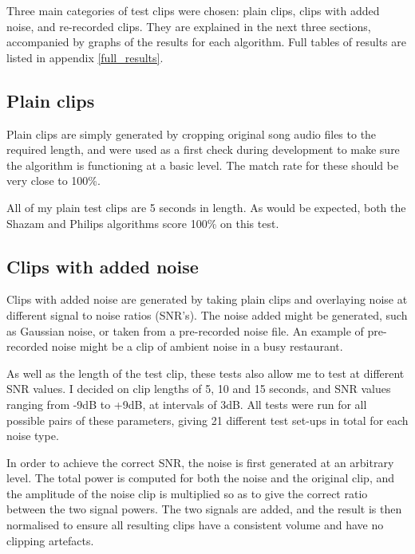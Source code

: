 \documentclass[12pt,a4paper,twoside,openright]{report}
\begin{document}
Three main categories of test clips were chosen: plain clips, clips with added noise, and re-recorded clips. They are explained in the next three sections, accompanied by graphs of the results for each algorithm. Full tables of results are listed in appendix \ref{full_results}.


\subsection{Plain clips}

Plain clips are simply generated by cropping original song audio files to the required length, and were used as a first check during development to make sure the algorithm is functioning at a basic level. The match rate for these should be very close to 100\%.

All of my plain test clips are 5 seconds in length. As would be expected, both the Shazam and Philips algorithms score 100\% on this test.


\subsection{Clips with added noise}

Clips with added noise are generated by taking plain clips and overlaying noise at different signal to noise ratios (SNR's). The noise added might be generated, such as Gaussian noise, or taken from a pre-recorded noise file. An example of pre-recorded noise might be a clip of ambient noise in a busy restaurant.

As well as the length of the test clip, these tests also allow me to test at different SNR values. I decided on clip lengths of 5, 10 and 15 seconds, and SNR values ranging from -9dB to +9dB, at intervals of 3dB. All tests were run for all possible pairs of these parameters, giving 21 different test set-ups in total for each noise type. 

In order to achieve the correct SNR, the noise is first generated at an arbitrary level. The total power is computed for both the noise and the original clip, and the amplitude of the noise clip is multiplied so as to give the correct ratio between the two signal powers. The two signals are added, and the result is then normalised to ensure all resulting clips have a consistent volume and have no clipping artefacts.
\end{document}

